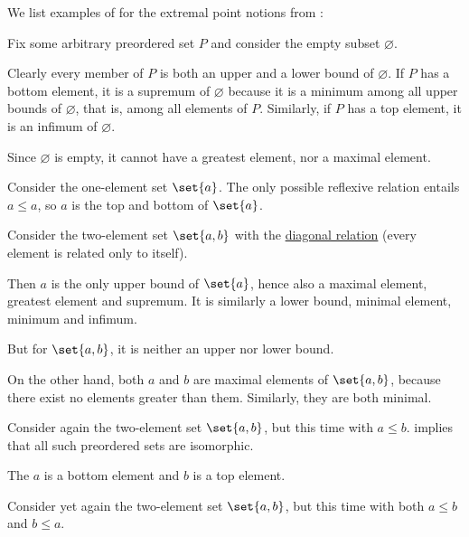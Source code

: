\begin{example}\label{ex:thm:def:extremal_points}
  We list examples of for the extremal point notions from :
  \begin{thmenum}
     Fix some arbitrary preordered set \( P \) and consider the empty subset \( \varnothing \).

    Clearly every member of \( P \) is both an upper and a lower bound of \( \varnothing \). If \( P \) has a bottom element, it is a supremum of \( \varnothing \) because it is a minimum among all upper bounds of \( \varnothing \), that is, among all elements of \( P \). Similarly, if \( P \) has a top element, it is an infimum of \( \varnothing \).

    Since \( \varnothing \) is empty, it cannot have a greatest element, nor a maximal element.

     Consider the one-element set \( \set{ a } \). The only possible reflexive relation entails \( a \leq a \), so \( a \) is the top and bottom of \( \set{ a } \).

     Consider the two-element set \( \set{ a, b } \) with the \hyperref[def:binary_relation/diagonal]{diagonal relation} (every element is related only to itself).

    Then \( a \) is the only upper bound of \( \set{ a } \), hence also a maximal element, greatest element and supremum. It is similarly a lower bound, minimal element, minimum and infimum.

    But for \( \set{ a, b } \), it is neither an upper nor lower bound.

    On the other hand, both \( a \) and \( b \) are maximal elements of \( \set{ a, b } \), because there exist no elements greater than them. Similarly, they are both minimal.

     Consider again the two-element set \( \set{ a, b } \), but this time with \( a \leq b \).  implies that all such preordered sets are isomorphic.

    The \( a \) is a bottom element and \( b \) is a top element.

     Consider yet again the two-element set \( \set{ a, b } \), but this time with both \( a \leq b \) and \( b \leq a \).


\end{thmenum}
\end{example}
